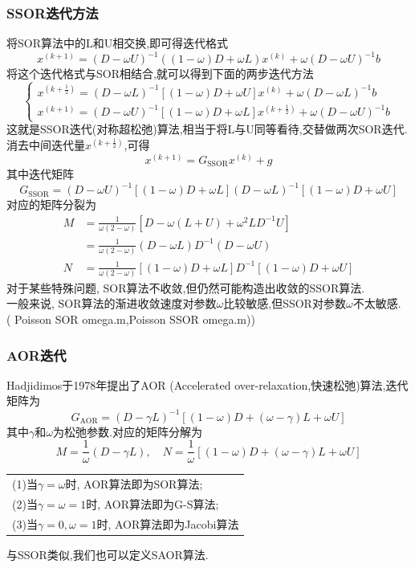 \documentclass[12pt,a4paper]{article}
\begin{document}
\subsubsection{SSOR迭代方法}
将SOR算法中的L和U相交换,即可得迭代格式
$$
x^{(k+1)}=(D-\omega U)^{-1}((1-\omega) D+\omega L) x^{(k)}+\omega(D-\omega U)^{-1} b
$$
将这个迭代格式与SOR相结合,就可以得到下面的两步迭代方法
$$
\left\{\begin{array}{l}{x^{\left(k+\frac{1}{2}\right)}=(D-\omega L)^{-1}[(1-\omega) D+\omega U] x^{(k)}+\omega(D-\omega L)^{-1} b} \\ {x^{(k+1)}=(D-\omega U)^{-1}[(1-\omega) D+\omega L] x^{\left(k+\frac{1}{2}\right)}+\omega(D-\omega U)^{-1} b}\end{array}\right.
$$
这就是{\color{blue}SSOR迭代}(对称超松弛)算法,相当于将L与U同等看待,交替做两次SOR迭代.\\
消去中间迭代量$x^{(k+\frac{1}{2})}$,可得
$$
x^{(k+1)}=G_{\mathrm{SSOR}} x^{(k)}+g
$$
其中迭代矩阵
$$
G_{\mathrm{SSOR}}=(D-\omega U)^{-1}[(1-\omega) D+\omega L](D-\omega L)^{-1}[(1-\omega) D+\omega U]
$$
对应的矩阵分裂为
$$
\begin{aligned} M &=\frac{1}{\omega(2-\omega)}\left[D-\omega(L+U)+\omega^{2} L D^{-1} U\right] \\ &=\frac{1}{\omega(2-\omega)}(D-\omega L) D^{-1}(D-\omega U) \\ N &=\frac{1}{\omega(2-\omega)}[(1-\omega) D+\omega L] D^{-1}[(1-\omega) D+\omega U] \end{aligned}
$$
对于某些特殊问题, SOR算法不收敛,但仍然可能构造出收敛的SSOR算法.\\
一般来说, SOR算法的渐进收敛速度对参数$\omega$比较敏感,但SSOR对参数$\omega$不太敏感.\\
({\color{blue} Poisson SOR omega.m,Poisson SSOR omega.m)})\\
\subsubsection{AOR迭代}
Hadjidimos于1978年提出了AOR (Accelerated over-relaxation,快速松弛)算法,迭代矩阵为
$$
G_{\mathrm{AOR}}=(D-\gamma L)^{-1}[(1-\omega) D+(\omega-\gamma) L+\omega U]
$$
其中$\gamma$和$\omega$为松弛参数.对应的矩阵分解为
$$
M=\frac{1}{\omega}(D-\gamma L), \quad N=\frac{1}{\omega}[(1-\omega) D+(\omega-\gamma) L+\omega U]
$$
\begin{tabular}{l}
\qquad  (1)当$\gamma=\omega$时, AOR算法即为SOR算法;\\
\qquad  (2)当$\gamma=\omega=1$时, AOR算法即为G-S算法;\\
\qquad  (3)当$\gamma=0,\omega=1$时, AOR算法即为Jacobi算法
\end{tabular}
与SSOR类似,我们也可以定义SAOR算法.
\end{document}
